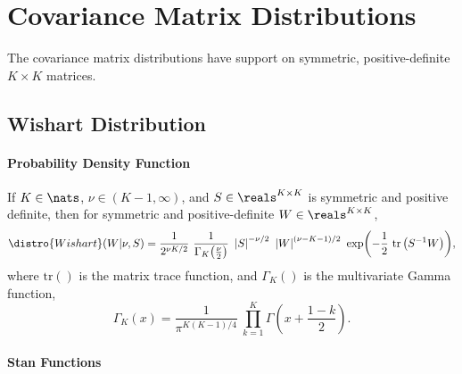 \begin{description}
%
%
\end{description}
\begin{description}
\end{description}




\chapter{Covariance Matrix Distributions}

\noindent
The covariance matrix distributions have support on symmetric,
positive-definite $K \times K$ matrices.


\section{Wishart Distribution}

\subsubsection{Probability Density Function}

If $K \in \nats$, $\nu \in (K-1,\infty)$, and $S \in \reals^{K \times K}$ is symmetric
and positive definite, then for symmetric and positive-definite $W \in
\reals^{K \times K}$,
\[
\distro{Wishart}(W|\nu,S)
=
\frac{1}{2^{\nu K / 2}}
\
\frac{1}{\Gamma_K \! \left( \frac{\nu}{2} \right)}
\
\left| S \right|^{-\nu/2}
\
\left| W \right|^{(\nu - K - 1)/2}
\
\exp \! \left(- \frac{1}{2} \ \mbox{tr}\left( S^{-1} W \right) \right)
\! ,
\]
%
where $\mbox{tr}()$ is the matrix trace function, and $\Gamma_K()$ is
the multivariate Gamma function,
\[
\Gamma_K(x) =
\frac{1}{\pi^{K(K-1)/4}}
\
\prod_{k=1}^K \Gamma \left( x + \frac{1 - k}{2} \right)
\!.
\]


\subsubsection{Stan Functions}

